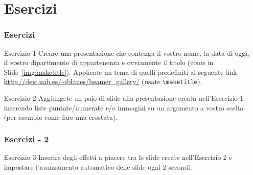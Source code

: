 \section{Esercizi}
\begin{frame}

  \frametitle{Esercizi}

  \begin{block}{Esercizio 1}
    Creare una presentazione che contenga il vostro nome, la data di oggi, il 
vostro dipartimento di appartenenza e ovviamente il titolo (come in 
Slide~\ref{img:maketitle}). Applicate un tema di quelli predefiniti al seguente 
link \url{http://deic.uab.es/~iblanes/beamer_gallery/} (usate 
\texttt{\textbackslash maketitle}).
  \end{block}

  \begin{block}{Esercizio 2}
    Aggiungete un paio di slide alla presentazione creata nell'Esercizio 1 
inserendo liste puntate/numerate e/o immagini su un argomento a vostra scelta 
(per esempio come fare una crostata).
  \end{block}
\end{frame}

\begin{frame}

  \frametitle{Esercizi - 2}
 
  \begin{block}{Esercizio 3}
    Inserire degli effetti a piacere tra le slide create nell'Esercizio 2 e 
impostare l'avanzamento automatico delle slide ogni 2 secondi.
  \end{block}
\end{frame}
